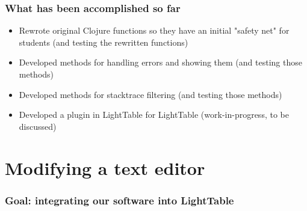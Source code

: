 \documentclass{beamer}
\begin{document}
\begin{frame}[fragile]
\frametitle{What has been accomplished so far}
\begin{itemize}
\item Rewrote original Clojure functions so they have an initial "safety net" for students (and testing the rewritten functions)
\item Developed methods for handling errors and showing them (and testing those methods)
\item Developed methods for stacktrace filtering (and testing those methods)
\item Developed a plugin in LightTable for LightTable (work-in-progress, to be discussed)
\end{itemize}
\end{frame}

\section{Modifying a text editor}

\begin{frame}[fragile]
\frametitle{Goal: integrating our software into LightTable}
		
\end{frame}
\end{document}
